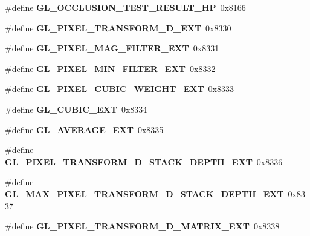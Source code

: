 \begin{DoxyCompactItemize}
\item 
\#define {\bfseries G\+L\+\_\+\+O\+C\+C\+L\+U\+S\+I\+O\+N\+\_\+\+T\+E\+S\+T\+\_\+\+R\+E\+S\+U\+L\+T\+\_\+\+H\+P}~0x8166\label{_s_d_l__opengl_8h_a48c637394588fad4caebda85852798e4}

\item 
\#define {\bfseries G\+L\+\_\+\+P\+I\+X\+E\+L\+\_\+\+T\+R\+A\+N\+S\+F\+O\+R\+M\+\_\+D\+\_\+\+E\+X\+T}~0x8330\label{_s_d_l__opengl_8h_a6c4074d4f3e0b6aa35113ffcad89cbd4}

\item 
\#define {\bfseries G\+L\+\_\+\+P\+I\+X\+E\+L\+\_\+\+M\+A\+G\+\_\+\+F\+I\+L\+T\+E\+R\+\_\+\+E\+X\+T}~0x8331\label{_s_d_l__opengl_8h_aa536f703a10c6e1c98609d18eb5b27bb}

\item 
\#define {\bfseries G\+L\+\_\+\+P\+I\+X\+E\+L\+\_\+\+M\+I\+N\+\_\+\+F\+I\+L\+T\+E\+R\+\_\+\+E\+X\+T}~0x8332\label{_s_d_l__opengl_8h_ac2b3ac2968a9f963442a37068216c5b0}

\item 
\#define {\bfseries G\+L\+\_\+\+P\+I\+X\+E\+L\+\_\+\+C\+U\+B\+I\+C\+\_\+\+W\+E\+I\+G\+H\+T\+\_\+\+E\+X\+T}~0x8333\label{_s_d_l__opengl_8h_a5454d12e79b181328af7522c69894232}

\item 
\#define {\bfseries G\+L\+\_\+\+C\+U\+B\+I\+C\+\_\+\+E\+X\+T}~0x8334\label{_s_d_l__opengl_8h_ad3505a5b199601042b70096953dcea02}

\item 
\#define {\bfseries G\+L\+\_\+\+A\+V\+E\+R\+A\+G\+E\+\_\+\+E\+X\+T}~0x8335\label{_s_d_l__opengl_8h_a7d2642d294cc8acf441427b05582738f}

\item 
\#define {\bfseries G\+L\+\_\+\+P\+I\+X\+E\+L\+\_\+\+T\+R\+A\+N\+S\+F\+O\+R\+M\+\_\+D\+\_\+\+S\+T\+A\+C\+K\+\_\+\+D\+E\+P\+T\+H\+\_\+\+E\+X\+T}~0x8336\label{_s_d_l__opengl_8h_a36f0cc06c0a9ff91047ec246da6f9295}

\item 
\#define {\bfseries G\+L\+\_\+\+M\+A\+X\+\_\+\+P\+I\+X\+E\+L\+\_\+\+T\+R\+A\+N\+S\+F\+O\+R\+M\+\_\+D\+\_\+\+S\+T\+A\+C\+K\+\_\+\+D\+E\+P\+T\+H\+\_\+\+E\+X\+T}~0x8337\label{_s_d_l__opengl_8h_ae870b6a44437358a114fd339ac5ede6c}

\item 
\#define {\bfseries G\+L\+\_\+\+P\+I\+X\+E\+L\+\_\+\+T\+R\+A\+N\+S\+F\+O\+R\+M\+\_\+D\+\_\+\+M\+A\+T\+R\+I\+X\+\_\+\+E\+X\+T}~0x8338\label{_s_d_l__opengl_8h_a77ee331b93ee5ec3aeba81c08c9dffea}


\end{DoxyCompactItemize}
